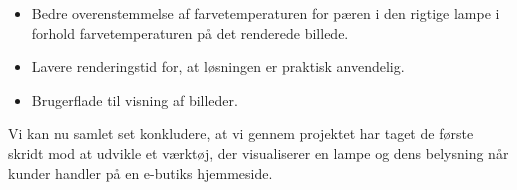 \begin{itemize}
\item Bedre overenstemmelse af farvetemperaturen for pæren i den rigtige lampe i forhold farvetemperaturen på det renderede billede.
\item Lavere renderingstid for, at løsningen er praktisk anvendelig.
\item Brugerflade til visning af billeder.
\end{itemize}

Vi kan nu samlet set konkludere, at vi gennem projektet har taget de første skridt mod at udvikle et værktøj, der visualiserer en lampe og dens belysning når kunder handler på en e-butiks hjemmeside.

\clearpage